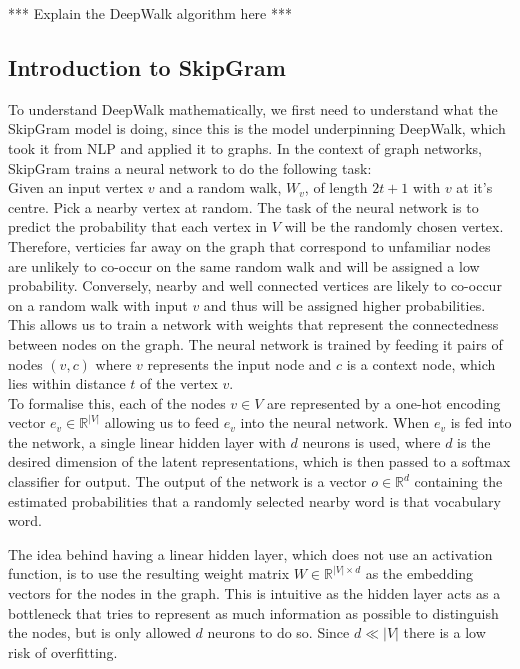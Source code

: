 \documentclass[a4paper]{article}
\begin{document}
*** Explain the DeepWalk algorithm here ***

\subsection{Introduction to SkipGram}
To understand DeepWalk mathematically, we first need to understand what the SkipGram
model is doing, since this is the model underpinning DeepWalk, which took it
from NLP and applied it to graphs. In the context of graph networks, SkipGram trains a neural network to do the
following task:\\
Given an input vertex $v$ and a random walk, $W_{v}$, of length $2t+1$ with $v$
at it's centre. Pick a nearby vertex at random. The task of the neural network is to
predict the probability that each vertex in $V$ will be the randomly chosen
vertex. Therefore, verticies far away on the graph that correspond to unfamiliar
nodes are unlikely to co-occur on the same random walk and will be assigned a
low probability. Conversely, nearby and well connected vertices are likely to
co-occur on a random walk with input $v$ and thus will be assigned higher
probabilities. This allows us to train a network with weights that represent the
connectedness between nodes on the graph. The neural network is trained by
feeding it pairs of nodes $(v, c)$ where $v$ represents the input node and $c$ is a context node, which lies within distance
$t$ of the vertex $v$.\\ 

To formalise this, each of the nodes $v \in V$ are represented by a one-hot
encoding vector $e_v \in \mathbb{R}^{|V|}$ allowing us to feed $e_v$ into the
neural network. When $e_v$ is fed into the network, a single linear hidden layer with
$d$ neurons is used, where $d$ is the desired dimension of the latent
representations, which is then passed to a softmax classifier for output. The
output of the network is a vector $o \in \mathbb{R}^d$ containing the estimated
probabilities that a randomly selected nearby word is that vocabulary word.

The idea behind having a linear hidden layer, which does not use an activation
function, is to use the resulting weight matrix $W \in \mathbb{R}^{|V| \times
  d}$ as the embedding vectors for the nodes in the graph. This is intuitive as
the hidden layer acts as a bottleneck that tries to represent as much
information as possible to distinguish the nodes, but is only allowed $d$
neurons to do so. Since $d \ll |V|$ there is a low risk of overfitting.
\end{document}
